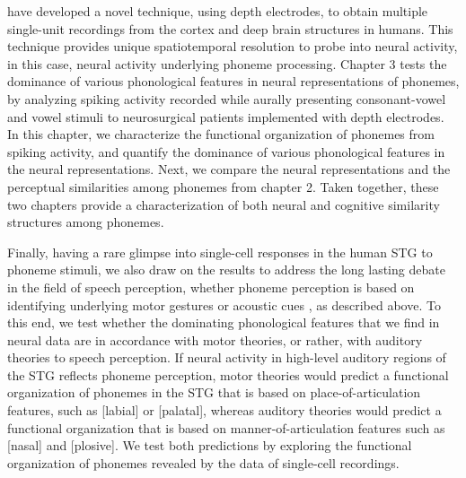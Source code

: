 \citet{fried1999cerebral} have developed a novel technique, using depth electrodes, to obtain multiple single-unit recordings from the cortex and deep brain structures in humans. This technique provides unique spatiotemporal resolution to probe into neural activity, in this case, neural activity underlying phoneme processing. Chapter 3 tests the dominance of various phonological features in neural representations of phonemes, by analyzing spiking activity recorded while aurally presenting consonant-vowel and vowel stimuli to neurosurgical patients implemented with depth electrodes. In this chapter, we characterize the functional organization of phonemes from spiking activity, and quantify the dominance of various phonological features in the neural representations. Next, we compare the neural representations and the perceptual similarities among phonemes from chapter 2. Taken together, these two chapters provide a characterization of both neural and cognitive similarity structures among phonemes. 

Finally, having a rare glimpse into single-cell responses in the human STG to phoneme stimuli, we also draw on the results to address the long lasting debate in the field of speech perception, whether phoneme perception is based on identifying underlying motor gestures \citep{liberman1967perception, liberman1985motor} or acoustic cues \citep{stevens1972quantal, stevens1989quantal}, as described above. To this end, we test whether the dominating phonological features that we find in neural data are in accordance with motor theories, or rather, with auditory theories to speech perception. If neural activity in high-level auditory regions of the STG reflects phoneme perception, motor theories would predict a functional organization of phonemes in the STG that is based on place-of-articulation features, such as [labial] or [palatal], whereas auditory theories would predict a functional organization that is based on manner-of-articulation features such as [nasal] and [plosive]. We test both predictions by exploring the functional organization of phonemes revealed by the data of single-cell recordings.